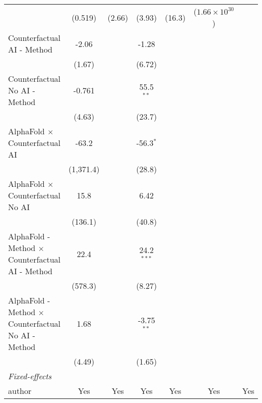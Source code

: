 \begin{tabular}{lcccccc}
                                                              & (0.519)     & (2.66)  & (3.93)       & (16.3)       & ($1.66\times 10^{30}$)  &   \\   
   Counterfactual AI - Method                                 & -2.06       &         & -1.28        &              &                         &   \\   
                                                              & (1.67)      &         & (6.72)       &              &                         &   \\   
   Counterfactual No AI - Method                              & -0.761      &         & 55.5$^{**}$  &              &                         &   \\   
                                                              & (4.63)      &         & (23.7)       &              &                         &   \\   
   AlphaFold $\times$ Counterfactual AI                       & -63.2       &         & -56.3$^{*}$  &              &                         &   \\   
                                                              & (1,371.4)   &         & (28.8)       &              &                         &   \\   
   AlphaFold $\times$ Counterfactual No AI                    & 15.8        &         & 6.42         &              &                         &   \\   
                                                              & (136.1)     &         & (40.8)       &              &                         &   \\   
   AlphaFold - Method $\times$ Counterfactual AI - Method     & 22.4        &         & 24.2$^{***}$ &              &                         &   \\   
                                                              & (578.3)     &         & (8.27)       &              &                         &   \\   
   AlphaFold - Method $\times$ Counterfactual No AI - Method  & 1.68        &         & -3.75$^{**}$ &              &                         &   \\   
                                                              & (4.49)      &         & (1.65)       &              &                         &   \\   
   \midrule
   \emph{Fixed-effects}\\
   author                                                     & Yes         & Yes     & Yes          & Yes          & Yes                     & Yes\\  

\end{tabular}
